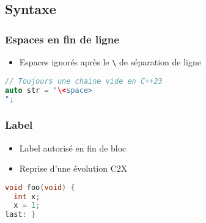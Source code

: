 \documentclass[C++.tex]{subfiles}
\begin{document}
\subsection*{Syntaxe}
\begin{frame}[fragile]
	\frametitle{Espaces en fin de ligne}
	\begin{itemize}
		\item Espaces ignorés après le \lstinline|\| de séparation de ligne
	\end{itemize}

	\begin{lstlisting}[language=C++]
// Toujours une chaine vide en C++23
auto str = "\<space>
";\end{lstlisting}

\end{frame}

\begin{frame}[fragile]
	\frametitle{Label}
	\begin{itemize}
		\item Label autorisé en fin de bloc
		\item Reprise d'une évolution C2X
	\end{itemize}

	\begin{lstlisting}[language=C++]
void foo(void) {
  int x;
  x = 1;
last: }\end{lstlisting}
\end{frame}
\end{document}
